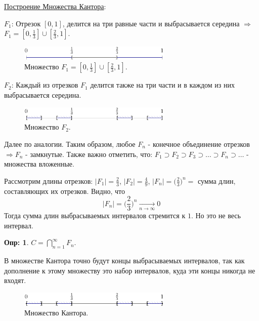 \documentclass[12pt]{article}
\theoremstyle{definition}
\newtheorem{defn}{Опр:}
\begin{document}
\uline{Построение Множества Кантора}:

$F_1$: Отрезок $[0,1]$, делится на три равные части и выбрасывается середина $\Rightarrow$  $F_1 = [0,\tfrac{1}{3}] \cup [\tfrac{2}{3}, 1]$.

\begin{figure}[H]
	\centering
	\includegraphics[width=0.65\textwidth]{14_1.png}
	\caption{Множество $F_1 = [0,\tfrac{1}{3}] \cup [\tfrac{2}{3}, 1]$.}
	\label{14_1}
\end{figure}

$F_2$: Каждый из отрезков $F_1$ делится также на три части и в каждом из них выбрасывается середина.

\begin{figure}[H]
	\centering
	\includegraphics[width=0.65\textwidth]{14_2.png}
	\caption{Множество $F_2$.}
	\label{14_2}
\end{figure}

Далее по аналогии. Таким образом, любое $F_n$ - конечное объединение отрезков $\Rightarrow F_n$ - замкнутые. Также важно отметить, что: $F_1 \supset F_2 \supset F_3 \supset \dotsc \supset F_n \supset \dotsc$ - множества вложенные.

Рассмотрим длины отрезков: $|F_1| = \frac{2}{3}$, $|F_2| = \frac{4}{9}$,  $|F_n| = \big(\frac{2}{3}\big)^n = $ сумма длин, составляющих их отрезков. Видно, что $$|F_n| = \bigg(\frac{2}{3}\bigg)^n \xrightarrow[n \to \infty]{} 0$$ Тогда сумма длин выбрасываемых интервалов стремится к $1$. Но это не весь интервал.

\begin{defn}
	 $C = \bigcap\limits_{n=1}^{\infty}F_n$.
\end{defn}

В множестве Кантора точно будут концы выбрасываемых интервалов, так как дополнение к этому множеству это набор интервалов, куда эти концы никогда не входят.
\begin{figure}[H]
	\centering
	\includegraphics[width=0.65\textwidth]{14_3.png}
	\caption{Множество Кантора.}
	\label{14_3}
\end{figure}
\end{document}
